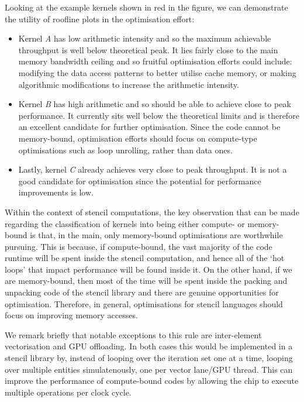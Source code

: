 Looking at the example kernels shown in red in the figure, we can demonstrate the utility of roofline plots in the optimisation effort:

\begin{itemize}
  \item
    Kernel \textit{A} has low arithmetic intensity and so the maximum achievable throughput is well below theoretical peak.
    It lies fairly close to the main memory bandwidth ceiling and so fruitful optimisation efforts could include: modifying the data access patterns to better utilise cache memory, or making algorithmic modifications to increase the arithmetic intensity.

  \item
    Kernel \textit{B} has high arithmetic and so should be able to achieve close to peak performance.
    It currently sits well below the theoretical limits and is therefore an excellent candidate for further optimisation.
    Since the code cannot be memory-bound, optimisation efforts should focus on compute-type optimisations such as loop unrolling, rather than data ones.

  \item
    Lastly, kernel \textit{C} already achieves very close to peak throughput.
    It is not a good candidate for optimisation since the potential for performance improvements is low.
\end{itemize}

Within the context of stencil computations, the key observation that can be made regarding the classification of kernels into being either compute- or memory-bound is that, in the main, only memory-bound optimisations are worthwhile pursuing.
This is because, if compute-bound, the vast majority of the code runtime will be spent inside the stencil computation, and hence all of the `hot loops' that impact performance will be found inside it.
On the other hand, if we are memory-bound, then most of the time will be spent inside the packing and unpacking code of the stencil library and there are genuine opportunities for optimisation.
Therefore, in general, optimisations for stencil languages should focus on improving memory accesses.

We remark briefly that notable exceptions to this rule are inter-element vectorisation and GPU offloading.
In both cases this would be implemented in a stencil library by, instead of looping over the iteration set one at a time, looping over multiple entities simulatenously, one per vector lane/GPU thread.
This can improve the performance of compute-bound codes by allowing the chip to execute multiple operations per clock cycle.

